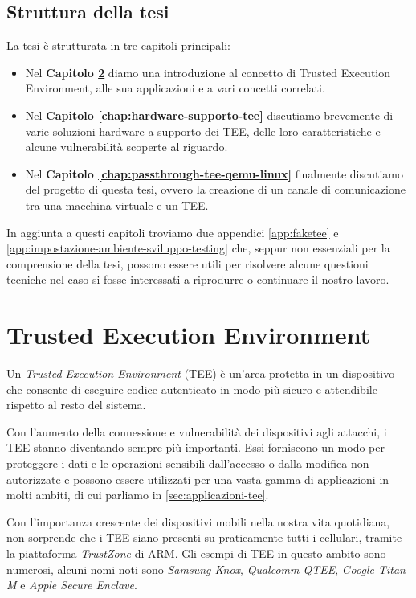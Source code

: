 \documentclass[12pt,italian]{report}
\begin{document}
\section{Struttura della tesi}
\label{sec:struttura-tesi}
La tesi è strutturata in tre capitoli principali:
\begin{itemize}
    \item Nel \textbf{Capitolo \ref{chap:tee}} diamo una introduzione al
    concetto di Trusted Execution Environment, alle sua applicazioni
    e a vari concetti correlati.
    \item Nel \textbf{Capitolo \ref{chap:hardware-supporto-tee}} discutiamo
    brevemente di varie soluzioni hardware a supporto dei TEE, delle loro
    caratteristiche e alcune vulnerabilità scoperte al riguardo.
    \item Nel \textbf{Capitolo \ref{chap:passthrough-tee-qemu-linux}}
    finalmente discutiamo del progetto di questa tesi, ovvero la creazione
    di un canale di comunicazione tra una macchina virtuale e un TEE.
\end{itemize}

In aggiunta a questi capitoli troviamo due appendici \ref{app:faketee} e
\ref{app:impostazione-ambiente-sviluppo-testing} che, seppur non essenziali
per la comprensione della tesi,
possono essere utili per risolvere alcune questioni tecniche
nel caso si fosse interessati a riprodurre o continuare il nostro lavoro.

\chapter{Trusted Execution Environment}
\label{chap:tee}
Un \textit{Trusted Execution Environment} (TEE) è un'area protetta in un
dispositivo che consente di eseguire codice autenticato in modo
più sicuro e attendibile rispetto al resto del sistema.

Con l'aumento della connessione e vulnerabilità dei dispositivi agli
attacchi, i TEE stanno diventando sempre più importanti.
Essi forniscono un modo per proteggere i dati e le operazioni sensibili
dall'accesso o dalla modifica non autorizzate e possono
essere utilizzati per una vasta gamma di applicazioni
in molti ambiti, di cui parliamo in \ref{sec:applicazioni-tee}.

Con l'importanza crescente dei dispositivi mobili nella nostra
vita quotidiana, non sorprende che i TEE siano presenti su praticamente
tutti i cellulari, tramite la piattaforma \textit{TrustZone} di ARM.
Gli esempi di TEE in questo ambito sono numerosi, alcuni nomi noti sono
\textit{Samsung Knox}, \textit{Qualcomm QTEE}, \textit{Google Titan-M}
e \textit{Apple Secure Enclave}.
\end{document}
